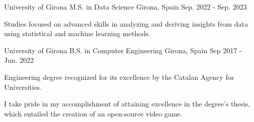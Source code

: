 

\begin{cventries}

  \cventry
    {University of Girona} %
    {M.S. in Data Science} %
    {Girona, Spain} %
    {Sep. 2022 - Sep. 2023} %
    {
      \begin{cvitems} %
      \item {
      Studies focused on advanced skills in analyzing and deriving insights from data using statistical and machine learning methods.
      }
      \end{cvitems}
    }

    \cventry
    {University of Girona} %
    {B.S. in Computer Engineering} %
    {Girona, Spain} %
    {Sep 2017 - Jun. 2022} %
    {
      \begin{cvitems} %
        \item {Engineering degree recognized for its excellence by the Catalan Agency for Universities.}
        \item {I take pride in my accomplishment of attaining excellence in the degree's thesis, which entailed the creation of an open-source video game.
}
      \end{cvitems}
    }

\end{cventries}
